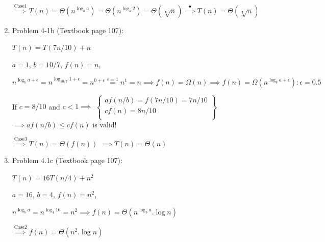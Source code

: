 \documentclass[11pt]{article}
\begin{document}
\begin{enumerate}
	$\overset{\mathrm{Case 1}}{\implies} T(n)=\Theta(n^{\log_b{a}})=\Theta(n^{\log_4{2}})=\Theta(\sqrt[•]{n}) 
	\overset{\mathrm{•}}{\implies} T(n)=\Theta(\sqrt[•]{n}) $ 







\item Problem 4-1b (Textbook page 107):

	$T(n)=T(7n/10)+n$

	$a=1$, $b=10/7$, $f(n)=n$, 
	
	$n^{\log_b{a}+\epsilon} \overset{}{=} n^{\log_{10/7}{1}+\epsilon}=n^{0+\epsilon}\overset{\epsilon = 1}{=}n^{1}=n  
	\overset{}{\implies} f(n)=\Omega(n)
	\overset{}{\implies} f(n)=\Omega(n^{\log_b{a}+\epsilon}):\epsilon=0.5$
	
	If $c=8/10$ and $c<1 \overset{}{\implies} $
	$
	    \left\{\begin{array}{lr}
        	af(n/b)=f(7n/10)=7n/10\\
        	cf(n)=8n/10\\
        \end{array}\right\}
    $ 
    $ \overset{}{\implies} af(n/b)\leq cf(n)$
     is valid!
    
    $ \overset{\mathrm{Case 3}}{\implies} T(n)=\Theta(f(n))$
    $ \overset{}{\implies} T(n)=\Theta(n)$



\item Problem 4.1c (Textbook page 107):

	$T(n)=16T(n/4)+n^{2}$
	
	$a=16$, $b=4$, $f(n)=n^{2}$,
	
	$n^{\log_b{a}} \overset{}{=} n^{\log_{4}{16}}=n^{2}  
	\overset{}{\implies} f(n)=\Theta(n^{\log_b{a}}.\log{n})$
	
	$	\overset{\mathrm{Case 2}}{\implies} f(n)=\Theta(n^{2}.\log{n})$
	
	























   
\end{enumerate}
\end{document}
